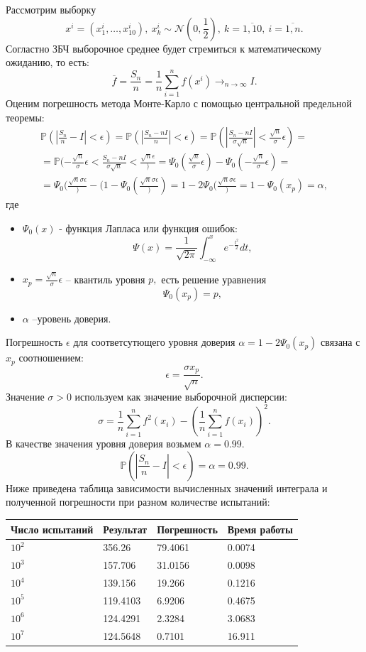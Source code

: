 \documentclass[11pt]{article}
\numberwithin{equation}{section}
\begin{document}
Рассмотрим выборку 
$$ x^{i} = (x_1^i, \dots, x_{10}^{i}), \ x_k^{i} \sim \mathcal{N}(0, \frac{1}{2}),\ k = \overline{1,10}, \ i = \overline{1,n}.$$
Согластно ЗБЧ выборочное среднее будет стремиться к математическому ожиданию, то есть:
$$ \overline{f} = \frac{S_n}{n} = \frac{1}{n} \sum_{i=1}^{n}f(x^{i}) \to_{n\to \infty} I. $$
Оценим погрешность метода Монте-Карло с помощью центральной предельной теоремы:
\begin{eqnarray}
  \mathbb{P}(|\frac{S_n}{n}-I| < \epsilon) = \mathbb{P}(|\frac{S_n-nI}{n}| < \epsilon) = \mathbb{P}(|\frac{S_n-nI}{\sigma\sqrt{n}}|< \frac{\sqrt{n}}{\sigma}\epsilon)=\\
  = \mathbb{P}(-\frac{\sqrt{n}}{\sigma}\epsilon< \frac{S_n-nI}{\sigma\sqrt{n}}< \frac{\sqrt{n}\epsilon})=\Psi_0(\frac{\sqrt{n}}{\sigma}\epsilon) - \Psi_0(-\frac{\sqrt{n}}{\sigma}\epsilon)=\\
  = \Psi_0(\frac{\sqrt{n}{\sigma}\epsilon})- (1- \Psi_0(\frac{\sqrt{n}{\sigma}\epsilon})) = 1 - 2\Psi_0(\frac{\sqrt{n}{\sigma}\epsilon}) = 1-\Psi_0(x_p) = \alpha,
\end{eqnarray}
где 
\begin{itemize}
  \item $\Psi_0(x)$ - функция Лапласа или функция ошибок:
  $$ \Psi(x) = \frac{1}{\sqrt{2\pi}} \int_{-\infty}^{x} e^{-\frac{t^2}{2}}dt,$$
  \item $x_p = \frac{\sqrt{n}}{\sigma}\epsilon$ -- квантиль уровня $p,$ есть решение уравнения
  $$ \Psi_0(x_p)=p,$$
  \item $\alpha$ --уровень доверия.
\end{itemize}
Погрешность $\epsilon$ для соответсутющего уровня доверия $\alpha = 1- 2\Psi_0(x_p)$ связана с $x_p$ соотношением:
$$ \epsilon = \frac{\sigma x_p}{\sqrt{n}}.$$
Значение $\sigma > 0$ используем как значение выборочной дисперсии:
$$ \sigma = \frac{1}{n}\sum_{i=1}^{n}f^2(x_i)- (\frac{1}{n} \sum_{i=1}^n f(x_i))^2.$$
В качестве значения уровня доверия возьмем $\alpha = 0.99.$ 
$$ \mathbb{P}(|\frac{S_n}{n}-I|< \epsilon)= \alpha = 0.99.$$
Ниже приведена таблица зависимости вычисленных значений интеграла и полученной погрешности при разном количестве испытаний:
\\
\begin{tabular}{ | l | l | l | l |}
  \hline
  Число испытаний & Результат & Погрешность & Время работы \\ \hline
  $10^2$ & 356.26 & 79.4061 & 0.0074 \\ \hline
  $10^3$ & 157.706 & 31.0156 & 0.0098 \\ \hline
  $10^4$ & 139.156 & 19.266 & 0.1216 \\ \hline
  $10^5$ & 119.4103 & 6.9206 & 0.4675 \\ \hline
  $10^6$ & 124.4291 & 2.3284 & 3.0683 \\ \hline
  $10^7$ & 124.5648 & 0.7101 & 16.911 \\
  \hline 
\end{tabular}
\\
\end{document}
